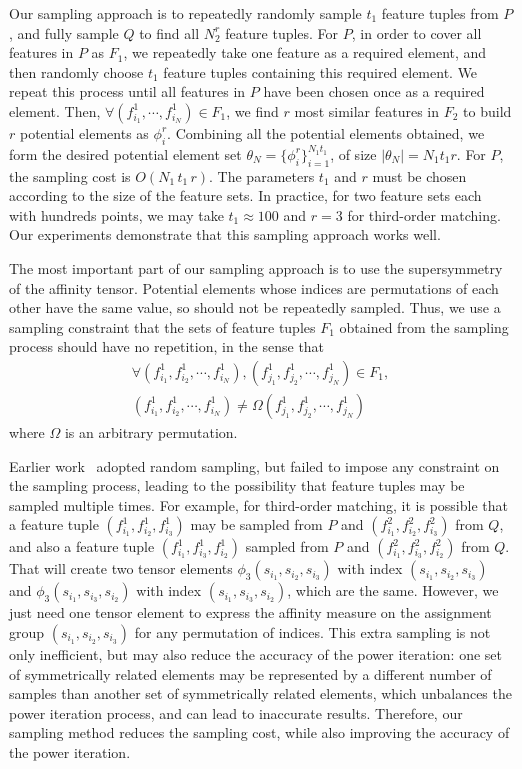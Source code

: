 Our sampling approach is to repeatedly randomly sample $t_1$ feature tuples from $P$, and fully sample $Q$ to find all $N_2^r$ feature tuples.
For $P$, in order to cover all features in $P$ as $F_1$, we repeatedly take one feature as a required element,
and then randomly choose $t_1$ feature tuples containing this required element.
We repeat this process until all features in $P$ have been chosen once as a required element.
Then, $\forall (f_{i_1}^1, \cdots, f_{i_N}^1)\in F_1$, we find $r$ most similar features in $F_2$ to build $r$ potential elements as $\phi_i^r$.
Combining all the potential elements obtained, we form the desired potential element set $\theta_N = \{\phi_i^r\}_{i=1}^{N_1 t_1}$, of size $|\theta_N| = N_1 t_1 r$.
For $P$, the sampling cost is $O(N_1\, t_1\,  r)$.
The parameters $t_1$ and $r$ must be chosen according to the size of the feature sets.
In practice, for two feature sets each with hundreds points,
we may take $t_1 \approx 100$ and $r=3$ for third-order matching.
Our experiments demonstrate that this sampling approach works well.


The most important part of our sampling approach is to use the supersymmetry of the affinity tensor. Potential elements whose indices are permutations of each other
have the same value, so should not be repeatedly sampled.
Thus, we use a sampling constraint that the sets of feature tuples $F_1$ obtained from the sampling process should have no repetition, in the sense that
\begin{eqnarray}
\label{equ:noredun2}
\forall (f_{i_1}^1,f_{i_2}^1,\cdots,f_{i_N}^1),(f_{j_1}^1,f_{j_2}^1,\cdots,f_{j_N}^1) \in F_1,\nonumber\\ (f_{i_1}^1,f_{i_2}^1,\cdots,f_{i_N}^1)\neq\Omega(f_{j_1}^1,f_{j_2}^1,\cdots,f_{j_N}^1)
\end{eqnarray}
where $\Omega$ is an arbitrary permutation.

Earlier work~\cite{Duchenne09,Zass08} adopted random sampling,
but failed to impose any constraint on the sampling process,
leading to the possibility that feature tuples may be sampled multiple times.
For example, for third-order matching, it is possible that a feature tuple $(f_{i_1}^1, f_{i_2}^1, f_{i_3}^1)$ may be sampled from $P$ and $(f_{i_1}^2, f_{i_2}^2, f_{i_3}^2)$ from $Q$,
and also a feature tuple $(f_{i_1}^1, f_{i_3}^1, f_{i_2}^1)$ sampled from $P$ and $(f_{i_1}^2, f_{i_3}^2, f_{i_2}^2)$ from $Q$. That will create two tensor elements $\phi_3(s_{i_1}, s_{i_2}, s_{i_3})$ with index $(s_{i_1}, s_{i_2}, s_{i_3})$ and $\phi_3(s_{i_1}, s_{i_3}, s_{i_2})$ with index $(s_{i_1}, s_{i_3}, s_{i_2})$, which are the same. However, we just need one tensor element to express the affinity measure on the assignment group $(s_{i_1}, s_{i_2}, s_{i_3})$ for any permutation of indices.
This extra sampling is not only inefficient, but may also reduce the accuracy of the power iteration: one set of symmetrically related elements  may be represented by a different number of samples than another set of  symmetrically related elements, which unbalances the power iteration process, and can lead to inaccurate results.
Therefore, our sampling method reduces the sampling cost, while also improving the accuracy of the power iteration.
